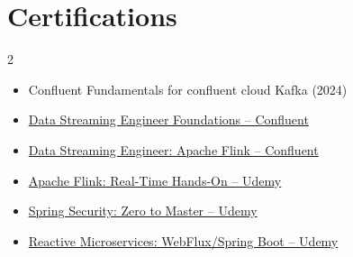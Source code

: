 \documentclass[letterpaper,10pt]{article}
\begin{document}
\section{Certifications}
\vspace{2pt}
\begin{multicols}{2}
\begin{itemize}[label=\textbullet, leftmargin=12pt, itemsep=0pt, topsep=0pt]
  \small
  \item Confluent Fundamentals for confluent cloud Kafka (2024)
  \item \href{https://certificates.confluent.io/2dbb1f4c-f079-456f-bc87-80dae55ea5f3}{Data Streaming Engineer Foundations -- Confluent}
  \item \href{https://certificates.confluent.io/6d33afa4-8112-466a-af3c-b4b41bde87b8}{Data Streaming Engineer: Apache Flink -- Confluent}
  \item \href{https://www.udemy.com/certificate/UC-cfae3d7e-dd68-4240-995f-4679a4fc5ffe/}{Apache Flink: Real-Time Hands-On -- Udemy}
  \item \href{https://www.udemy.com/certificate/UC-0e123ee6-3468-47ed-96a4-80c4f3c15f9a/}{Spring Security: Zero to Master -- Udemy}
  \item \href{https://www.udemy.com/certificate/UC-bc06e57a-388c-44d9-94e0-d57702908417/}{Reactive Microservices: WebFlux/Spring Boot -- Udemy}
\end{itemize}
\end{multicols}
\end{document}
